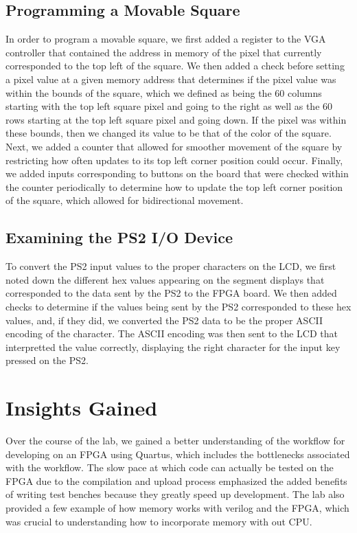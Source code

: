 \documentclass[letterpaper]{article} %
\begin{document}
    \subsection{Programming a Movable Square}
        In order to program a movable square, we first added a register to the VGA controller that contained the address in memory of the pixel that currently corresponded to the top left of the square. We then added a check before setting a pixel value at a given memory address that determines if the pixel value was within the bounds of the square, which we defined as being the 60 columns starting with the top left square pixel and going to the right as well as the 60 rows starting at the top left square pixel and going down. If the pixel was within these bounds, then we changed its value to be that of the color of the square. Next, we added a counter that allowed for smoother movement of the square by restricting how often updates to its top left corner position could occur. Finally, we added inputs corresponding to buttons on the board that were checked within the counter periodically to determine how to update the top left corner position of the square, which allowed for bidirectional movement. 

    \subsection{Examining the PS2 I/O Device}
        To convert the PS2 input values to the proper characters on the LCD, we first noted down the different hex values appearing on the segment displays that corresponded to the data sent by the PS2 to the FPGA board. We then added checks to determine if the values being sent by the PS2 corresponded to these hex values, and, if they did, we converted the PS2 data to be the proper ASCII encoding of the character. The ASCII encoding was then sent to the LCD that interpretted the value correctly, displaying the right character for the input key pressed on the PS2.
    \section{Insights Gained}
    Over the course of the lab, we gained a better understanding of the workflow for developing on an FPGA using Quartus, which includes the bottlenecks associated with the workflow. The slow pace at which code can actually be tested on the FPGA due to the compilation and upload process emphasized the added benefits of writing test benches because they greatly speed up development. The lab also provided a few example of how memory works with verilog and the FPGA, which was crucial to understanding how to incorporate memory with out CPU. 
\end{document}
